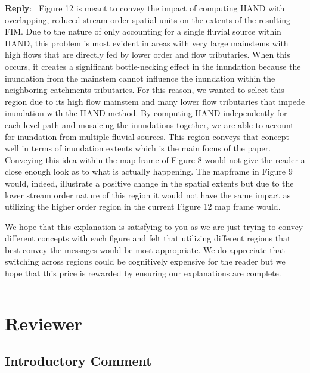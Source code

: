 \documentclass[11pt]{article}
\newcounter{reviewer}
\newcommand{\reviewersection}{\stepcounter{reviewer} \bigskip \hrule
                  \section*{Reviewer \thereviewer}}
\newenvironment{reply}
   {\medskip \noindent \begin{sf}\textbf{Reply}:\  }
   {\medskip \end{sf}}
\begin{document}
\begin{reply}
Figure 12 is meant to convey the impact of computing HAND with overlapping, reduced stream order spatial units on the extents of the resulting FIM.
Due to the nature of only accounting for a single fluvial source within HAND, this problem is most evident in areas with very large mainstems with high flows that are directly fed by lower order and flow tributaries.
When this occurs, it creates a significant bottle-necking effect in the inundation because the inundation from the mainstem cannot influence the inundation within the neighboring catchments tributaries.
For this reason, we wanted to select this region due to its high flow mainstem and many lower flow tributaries that impede inundation with the HAND method.
By computing HAND independently for each level path and mosaicing the inundations together, we are able to account for inundation from multiple fluvial sources.
This region conveys that concept well in terms of inundation extents which is the main focus of the paper.
Conveying this idea within the map frame of Figure 8 would not give the reader a close enough look as to what is actually happening.
The mapframe in Figure 9 would, indeed, illustrate a positive change in the spatial extents but due to the lower stream order nature of this region it would not have the same impact as utilizing the higher order region in the current Figure 12 map frame would.

We hope that this explanation is satisfying to you as we are just trying to convey different concepts with each figure and felt that utilizing different regions that best convey the messages would be most appropriate.
We do appreciate that switching across regions could be cognitively expensive for the reader but we hope that this price is rewarded by ensuring our explanations are complete. 
\end{reply}

\clearpage
\reviewersection

\subsection*{Introductory Comment}
\end{document}
